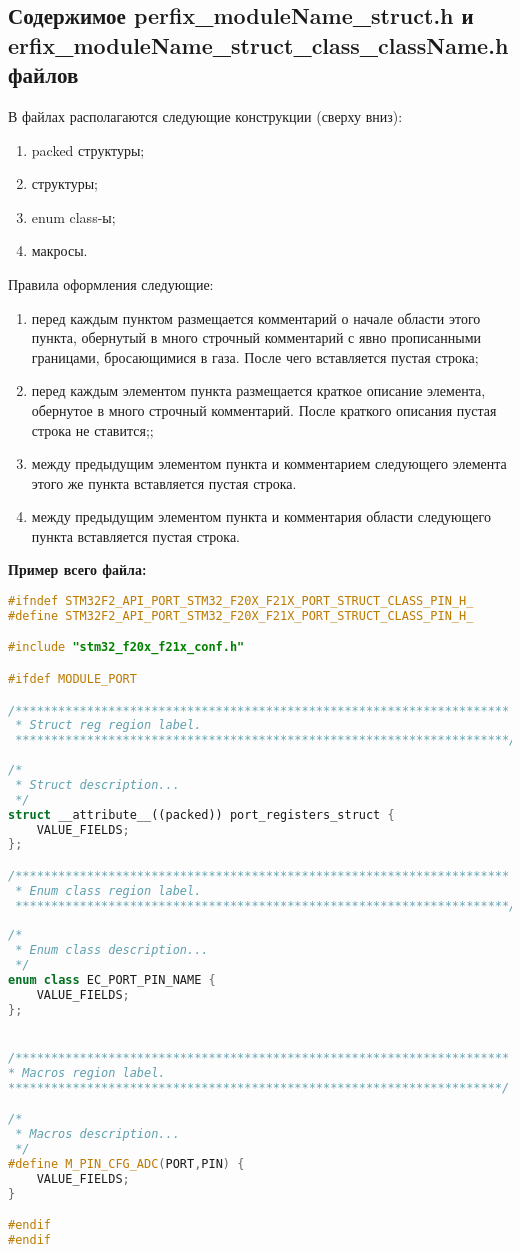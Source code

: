 \subsection{Содержимое perfix\_moduleName\_struct.h и\\erfix\_moduleName\_struct\_class\_className.h файлов}\label{p:struc:h}
В файлах располагаются следующие конструкции (сверху вниз):
\begin{enumerate}
	\item packed структуры;
	\item структуры;
	\item enum class-ы;
	\item макросы.
\end{enumerate}
Правила оформления следующие:
\begin{enumerate}
	\item перед каждым пунктом размещается комментарий о начале области этого пункта, обернутый в много строчный комментарий с явно прописанными границами, бросающимися в газа.  После чего вставляется пустая строка;
	\item перед каждым элементом пункта размещается краткое описание элемента, обернутое в много строчный комментарий. После краткого описания пустая строка не ставится;;
	\item между предыдущим элементом пункта и комментарием следующего элемента этого же пункта вставляется пустая строка.
	\item между предыдущим элементом пункта и комментария области следующего пункта вставляется пустая строка.
\end{enumerate}
\textbf{Пример всего файла:}\begin{lstlisting}[language=C++, frame=tlBR, basicstyle=\fontsize{9}{9}\ttfamily]
#ifndef STM32F2_API_PORT_STM32_F20X_F21X_PORT_STRUCT_CLASS_PIN_H_
#define STM32F2_API_PORT_STM32_F20X_F21X_PORT_STRUCT_CLASS_PIN_H_

#include "stm32_f20x_f21x_conf.h"

#ifdef MODULE_PORT

/*********************************************************************
 * Struct reg region label.
 *********************************************************************/
 
/*
 * Struct description...
 */
struct __attribute__((packed)) port_registers_struct {
	VALUE_FIELDS;
};

/*********************************************************************
 * Enum class region label.
 *********************************************************************/
 
/*
 * Enum class description...
 */
enum class EC_PORT_PIN_NAME {
	VALUE_FIELDS;
};


/*********************************************************************
* Macros region label.
*********************************************************************/

/*
 * Macros description...
 */
#define M_PIN_CFG_ADC(PORT,PIN)	{
	VALUE_FIELDS;
}

#endif
#endif\end{lstlisting}